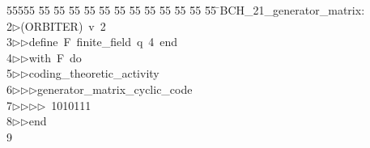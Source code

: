 %
%
\begin{tabbing}
55555 \= 55 \= 55 \= 55 \= 55 \= 55 \= 55 \= 55 \= 55 \= 55 \= 55 \= 55 \= 55 \= \>BCH\_21\_generator\_matrix:\\[0pt]
2\>$\triangleright$\>(ORBITER)\ v\ 2\ \\[0pt]
3\>$\triangleright$\>$\triangleright$\>define\ F\ finite\_field\ q\ 4\ end\ \\[0pt]
4\>$\triangleright$\>$\triangleright$\>with\ F\ do\ \\[0pt]
5\>$\triangleright$\>$\triangleright$\>coding\_theoretic\_activity\ \\[0pt]
6\>$\triangleright$\>$\triangleright$\>$\triangleright$\>generator\_matrix\_cyclic\_code\ \\[0pt]
7\>$\triangleright$\>$\triangleright$\>$\triangleright$\>$\triangleright$\ 1010111\ \\[0pt]
8\>$\triangleright$\>$\triangleright$\>end\\[0pt]
9\>\end{tabbing}
